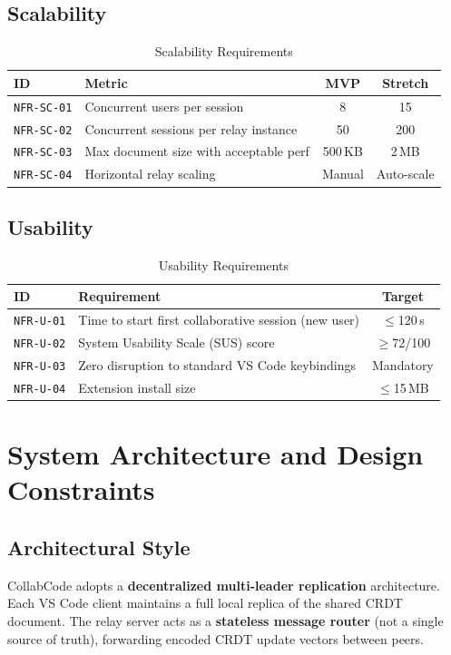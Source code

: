 \documentclass[12pt, a4paper, oneside]{article}
\newcommand{\reqid}[1]{\texttt{\textcolor{primaryblue}{#1}}}
\begin{document}
\subsection{Scalability}

\begin{table}[H]
\centering
\caption{Scalability Requirements}
\begin{tabularx}{\textwidth}{l X c c}
\toprule
\textbf{ID} & \textbf{Metric} & \textbf{MVP} & \textbf{Stretch} \\
\midrule
\reqid{NFR-SC-01} & Concurrent users per session & 8 & 15 \\
\reqid{NFR-SC-02} & Concurrent sessions per relay instance & 50 & 200 \\
\reqid{NFR-SC-03} & Max document size with acceptable perf & 500\,KB & 2\,MB \\
\reqid{NFR-SC-04} & Horizontal relay scaling & Manual & Auto-scale \\
\bottomrule
\end{tabularx}
\end{table}

\subsection{Usability}

\begin{table}[H]
\centering
\caption{Usability Requirements}
\begin{tabularx}{\textwidth}{l X c}
\toprule
\textbf{ID} & \textbf{Requirement} & \textbf{Target} \\
\midrule
\reqid{NFR-U-01} & Time to start first collaborative session (new user) & $\leq$120\,s \\
\reqid{NFR-U-02} & System Usability Scale (SUS) score & $\geq$72/100 \\
\reqid{NFR-U-03} & Zero disruption to standard VS Code keybindings & Mandatory \\
\reqid{NFR-U-04} & Extension install size & $\leq$15\,MB \\
\bottomrule
\end{tabularx}
\end{table}

\section{System Architecture and Design Constraints}

\subsection{Architectural Style}
CollabCode adopts a \textbf{decentralized multi-leader replication} architecture. Each VS Code client maintains a full local replica of the shared CRDT document. The relay server acts as a \textbf{stateless message router} (not a single source of truth), forwarding encoded CRDT update vectors between peers.
\end{document}
